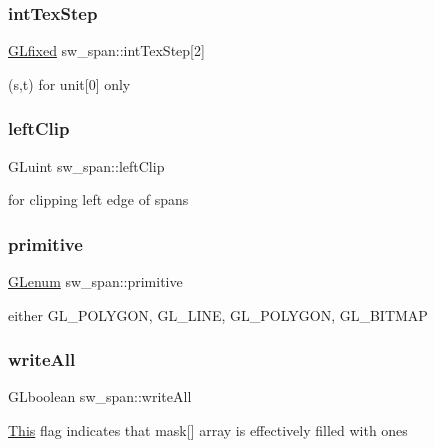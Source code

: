 \subsubsection{\texorpdfstring{int\+Tex\+Step}{intTexStep}}
{\footnotesize\ttfamily \hyperlink{glheader_8h_ad6d3fa892df40dedf48ee6d84529ae5e}{G\+Lfixed} sw\+\_\+span\+::int\+Tex\+Step\mbox{[}2\mbox{]}}

(s,t) for unit\mbox{[}0\mbox{]} only \mbox{\label{structsw__span_ae07b7e3b7b05ad280c65cd9c56a79d94}} 
\subsubsection{\texorpdfstring{left\+Clip}{leftClip}}
{\footnotesize\ttfamily G\+Luint sw\+\_\+span\+::left\+Clip}

for clipping left edge of spans \mbox{\label{structsw__span_ad52165048b6c688e607157dae554a8a4}} 
\subsubsection{\texorpdfstring{primitive}{primitive}}
{\footnotesize\ttfamily \hyperlink{interfacevoid}{G\+Lenum} sw\+\_\+span\+::primitive}

either G\+L\+\_\+\+P\+O\+L\+Y\+G\+ON, G\+L\+\_\+\+L\+I\+NE, G\+L\+\_\+\+P\+O\+L\+Y\+G\+ON, G\+L\+\_\+\+B\+I\+T\+M\+AP \mbox{\label{structsw__span_a45786c94bddf28dc8fba6c23d66117d2}} 
\subsubsection{\texorpdfstring{write\+All}{writeAll}}
{\footnotesize\ttfamily G\+Lboolean sw\+\_\+span\+::write\+All}

\hyperlink{namespace_this}{This} flag indicates that mask\mbox{[}\mbox{]} array is effectively filled with ones \mbox{\label{structsw__span_ab0470c3cea55cd9a25c9afa66ea282f8}} 
